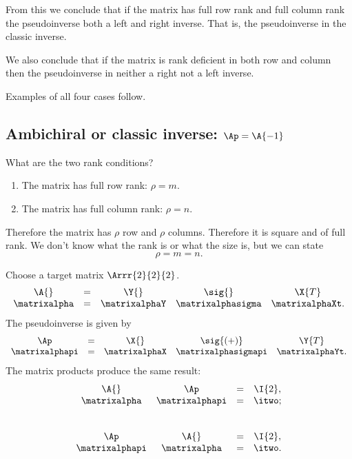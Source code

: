 From this we conclude that if the matrix has full row rank and full column rank the pseudoinverse both a left and right inverse. That is, the pseudoinverse in the classic inverse.

We also conclude that if the matrix is rank deficient in both row and column then the pseudoinverse in neither a right not a left inverse.

Examples of all four cases follow.

\subsection{Ambichiral or classic inverse: $\Ap = \A{-1}$}
What are the two rank conditions?
\begin{enumerate}
\item The matrix has full row rank: $\rho = m$.
\item The matrix has full column rank: $\rho = n$.
\end{enumerate}
Therefore the matrix has $\rho$ row and $\rho$ columns. Therefore it is square and of full rank. We don't know what the rank is or what the size is, but we can state
\begin{equation}
  \rho = m = n.
\end{equation}

Choose a target matrix $\Arrr{2}{2}{2}$.
\begin{equation*}
  \begin{array}{ccccc}
    \A{} &=& \Y{} & \sig{} & \X{T} \\
    \matrixalpha &=
    & \matrixalphaY 
    & \matrixalphasigma 
    & \matrixalphaXt.
  \end{array}
\end{equation*}
The pseudoinverse is given by
\begin{equation*}
  \begin{array}{ccccc}
    \Ap &=& \X{} & \sig{(+)} & \Y{T} \\
    \matrixalphapi &=
    & \matrixalphaX 
    & \matrixalphasigmapi
    & \matrixalphaYt.
  \end{array}
\end{equation*}
The matrix products produce the same result:
\begin{equation*}
  \begin{array}{cccc}
  \A{}&\Ap&=&\I{2},\\
  \matrixalpha &
  \matrixalphapi & = &
  \itwo;\\[25pt]
  \Ap&\A{}&=&\I{2},\\
  \matrixalphapi &
  \matrixalpha & = &
  \itwo.
  \end{array}
\end{equation*}

